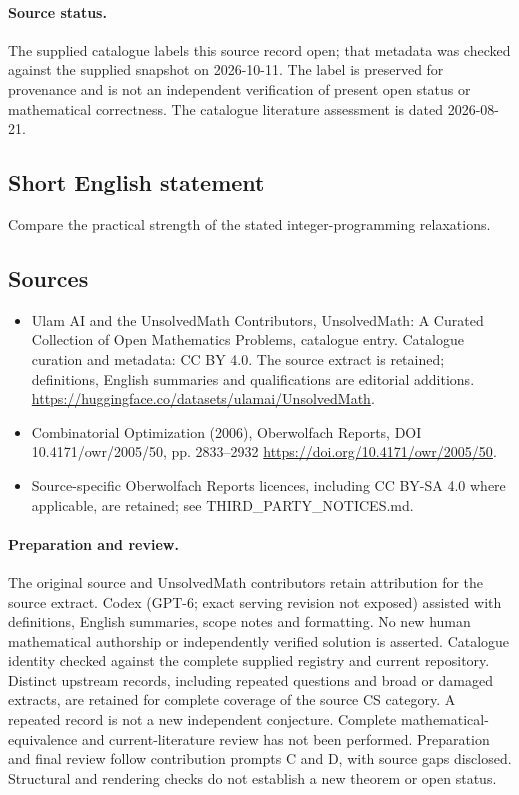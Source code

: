 \documentclass[11pt]{article}
\begin{document}
\paragraph{Source status.}
The supplied catalogue labels this source record open; that metadata was checked against the supplied snapshot on 2026-10-11. The label is preserved for provenance and is not an independent verification of present open status or mathematical correctness. The catalogue literature assessment is dated 2026-08-21.
\subsection{Short English statement}
Compare the practical strength of the stated integer-programming relaxations.
\subsection{Sources}
\begin{itemize}
\item[S1] Ulam AI and the UnsolvedMath Contributors, UnsolvedMath: A Curated Collection of Open Mathematics Problems, catalogue entry. Catalogue curation and metadata: CC BY 4.0. The source extract is retained; definitions, English summaries and qualifications are editorial additions.
\url{https://huggingface.co/datasets/ulamai/UnsolvedMath}.
\item[S2] Combinatorial Optimization (2006), Oberwolfach Reports, DOI 10.4171/owr/2005/50, pp. 2833--2932
\url{https://doi.org/10.4171/owr/2005/50}.
\item Source-specific Oberwolfach Reports licences, including CC BY-SA 4.0 where applicable, are retained; see THIRD\_PARTY\_NOTICES.md.
\end{itemize}
\paragraph{Preparation and review.}
The original source and UnsolvedMath contributors retain attribution for the source extract. Codex (GPT-6; exact serving revision not exposed) assisted with definitions, English summaries, scope notes and formatting. No new human mathematical authorship or independently verified solution is asserted. Catalogue identity checked against the complete supplied registry and current repository. Distinct upstream records, including repeated questions and broad or damaged extracts, are retained for complete coverage of the source CS category. A repeated record is not a new independent conjecture. Complete mathematical-equivalence and current-literature review has not been performed. Preparation and final review follow contribution prompts C and D, with source gaps disclosed. Structural and rendering checks do not establish a new theorem or open status.
\label{end:statement}
\end{document}
